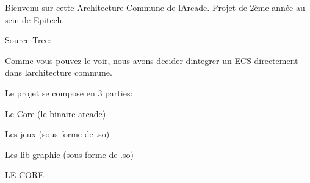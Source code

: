 Bienvenu sur cette Architecture Commune de l\textquotesingle{}\mbox{\hyperlink{a00060}{Arcade}}. Projet de 2ème année au sein de Epitech.

Source Tree\+: 
\begin{DoxyCode}{0}
\DoxyCodeLine{}

\end{DoxyCode}


Comme vous pouvez le voir, nous avons decider d\textquotesingle{}integrer un ECS directement dans l\textquotesingle{}architecture commune.

Le projet se compose en 3 parties\+:
\begin{DoxyItemize}
\item Le Core (le binaire arcade)
\item Les jeux (sous forme de .so)
\item Les lib graphic (sous forme de .so)
\end{DoxyItemize}

 LE CORE

